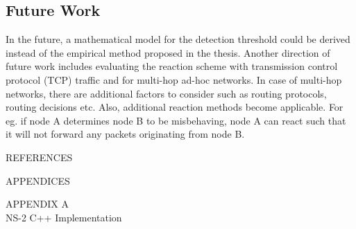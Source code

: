 \documentclass[12pt,letterpaper,english]{article}
\begin{document}
\subsection{Future Work}
\indent In the future, a mathematical model for the detection threshold could be derived instead of the empirical method proposed	 in the thesis. Another direction of future work includes evaluating the reaction scheme with transmission control protocol (TCP) traffic and for multi-hop ad-hoc networks.
In case of multi-hop networks, there are additional factors to consider such as routing protocols, routing decisions etc. Also, additional reaction methods become applicable. For eg. if node A determines node B to be misbehaving, node A can react such that it will not forward any packets originating from node B.
\newpage
\begin{center}
\vspace*{3.5in}
REFERENCES
\end{center}
\newpage
\singlespacing
\begin{center}
\printbibliography
\end{center}
\doublespacing
\clearpage
\newpage
\appendix
\begin{center}
\vspace*{3.5in}
APPENDICES
\end{center}
\newpage
\begin{center}APPENDIX A \\ NS-2 C++ Implementation \end{center}
\end{document}

